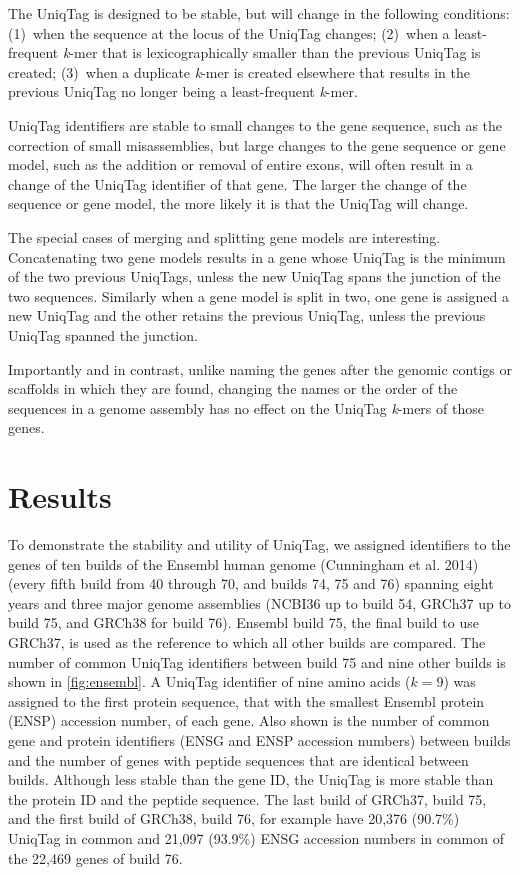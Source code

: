 \documentclass[
  12pt,
  oneside,
  openany]{book}
\begin{document}
The UniqTag is designed to be stable, but will change in the following conditions: (1)~when the sequence at the locus of the UniqTag changes; (2)~when a least-frequent \emph{k}-mer that is lexicographically smaller than the previous UniqTag is created; (3)~when a duplicate \emph{k}-mer is created elsewhere that results in the previous UniqTag no longer being a least-frequent \emph{k}-mer.

UniqTag identifiers are stable to small changes to the gene sequence, such as the correction of small misassemblies, but large changes to the gene sequence or gene model, such as the addition or removal of entire exons, will often result in a change of the UniqTag identifier of that gene. The larger the change of the sequence or gene model, the more likely it is that the UniqTag will change.

The special cases of merging and splitting gene models are interesting. Concatenating two gene models results in a gene whose UniqTag is the minimum of the two previous UniqTags, unless the new UniqTag spans the junction of the two sequences. Similarly when a gene model is split in two, one gene is assigned a new UniqTag and the other retains the previous UniqTag, unless the previous UniqTag spanned the junction.

Importantly and in contrast, unlike naming the genes after the genomic contigs or scaffolds in which they are found, changing the names or the order of the sequences in a genome assembly has no effect on the UniqTag \emph{k}-mers of those genes.

\hypertarget{results-2}{%
\section{Results}\label{results-2}}

To demonstrate the stability and utility of UniqTag, we assigned identifiers to the genes of ten builds of the Ensembl human genome (Cunningham et al. 2014) (every fifth build from 40 through 70, and builds 74, 75 and 76) spanning eight years and three major genome assemblies (NCBI36 up to build 54, GRCh37 up to build 75, and GRCh38 for build 76). Ensembl build 75, the final build to use GRCh37, is used as the reference to which all other builds are compared. The number of common UniqTag identifiers between build 75 and nine other builds is shown in \cref{fig:ensembl}. A UniqTag identifier of nine amino acids (\(k=9\)) was assigned to the first protein sequence, that with the smallest Ensembl protein (ENSP) accession number, of each gene. Also shown is the number of common gene and protein identifiers (ENSG and ENSP accession numbers) between builds and the number of genes with peptide sequences that are identical between builds. Although less stable than the gene ID, the UniqTag is more stable than the protein ID and the peptide sequence. The last build of GRCh37, build 75, and the first build of GRCh38, build 76, for example have 20,376 (90.7\%) UniqTag in common and 21,097 (93.9\%) ENSG accession numbers in common of the 22,469 genes of build 76.
\end{document}
